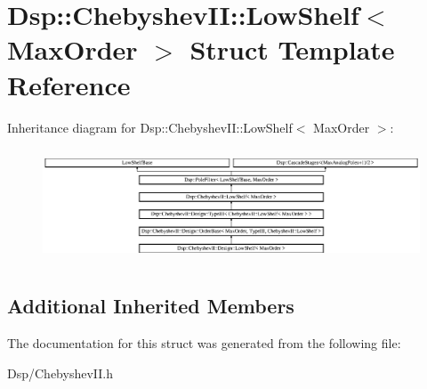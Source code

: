 \hypertarget{structDsp_1_1ChebyshevII_1_1LowShelf}{\section{Dsp\-:\-:Chebyshev\-I\-I\-:\-:Low\-Shelf$<$ Max\-Order $>$ Struct Template Reference}
\label{structDsp_1_1ChebyshevII_1_1LowShelf}
}
Inheritance diagram for Dsp\-:\-:Chebyshev\-I\-I\-:\-:Low\-Shelf$<$ Max\-Order $>$\-:\begin{figure}[H]
\begin{center}
\leavevmode
\includegraphics[height=3.387097cm]{structDsp_1_1ChebyshevII_1_1LowShelf}
\end{center}
\end{figure}
\subsection*{Additional Inherited Members}


The documentation for this struct was generated from the following file\-:\begin{DoxyCompactItemize}
\item 
Dsp/Chebyshev\-I\-I.\-h\end{DoxyCompactItemize}
